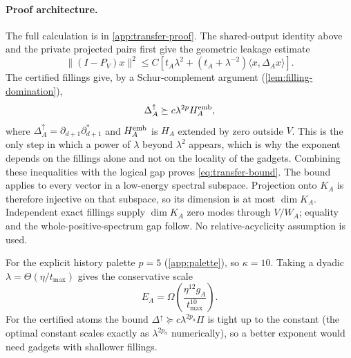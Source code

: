 \paragraph{Proof architecture.}
The full calculation is in \cref{app:transfer-proof}.  The shared-output
identity above and the private projected pairs first give the geometric
leakage estimate
\begin{equation}
\label{eq:geometric-leakage}
\|(I-P_V)x\|^2
\le C\left[t_A\lambda^2+
(t_A+\lambda^{-2})\langle x,\Delta_Ax\rangle\right].
\end{equation}
The certified fillings give, by a Schur-complement argument
(\cref{lem:filling-domination}),
\begin{equation}
\label{eq:logical-domination}
\Delta_A^\uparrow\succeq c\lambda^{2p} H_A^{\rm emb},
\end{equation}
where \(\Delta_A^\uparrow=\partial_{d+1}\partial_{d+1}^*\) and
\(H_A^{\rm emb}\) is \(H_A\) extended by zero outside \(V\).  This is the only
step in which a power of \(\lambda\) beyond \(\lambda^2\) appears, which is
why the exponent depends on the fillings alone and not on the locality of
the gadgets.
Combining these inequalities with the logical gap proves
\cref{eq:transfer-bound}.  The bound applies to every vector in a low-energy
spectral subspace.  Projection onto \(K_A\) is therefore injective on that
subspace, so its dimension is at most \(\dim K_A\).  Independent exact
fillings supply \(\dim K_A\) zero modes through \(V/W_A\); equality and the
whole-positive-spectrum gap follow.  No relative-acyclicity assumption is
used.

For the explicit history palette \(p=5\) (\cref{app:palette}), so
\(\kappa=10\).  Taking a dyadic \(\lambda=\Theta(\eta/t_{\max})\) gives the
conservative scale
\begin{equation}
\label{eq:weighted-gap}
E_A=\Omega\!\left(\frac{\eta^{12}g_A}{t_{\max}^{10}}\right).
\end{equation}
For the certified atoms the bound \(\Delta^\uparrow\succeq c\lambda^{2p_a}\Pi\)
is tight up to the constant (the optimal constant scales exactly as
\(\lambda^{2p_a}\) numerically), so a better exponent would need gadgets with
shallower fillings.
